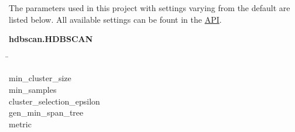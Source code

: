 The parameters used in this project with settings varying from the default are listed below. All available settings can be fount in the \href{https://hdbscan.readthedocs.io/en/latest/api.html}{API}.

\begin{leftbar}
    \textbf{hdbscan.HDBSCAN}
    \begin{nstabbing}
        \qquad\qquad\qquad\qquad\qquad\quad\=\kill

        min\_cluster\_size \\
        
        min\_samples \\
        
        cluster\_selection\_epsilon \\
        
        gen\_min\_span\_tree \\
        
        metric %
    \end{nstabbing}
\end{leftbar}

